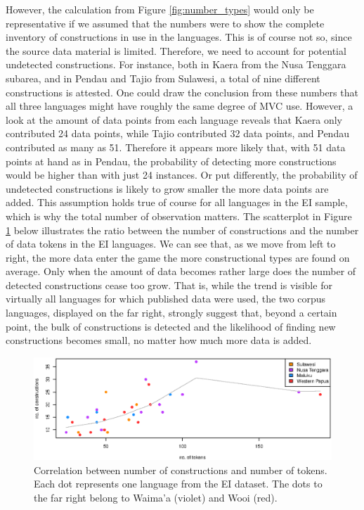 However, the calculation from Figure \ref{fig:number_types} would only be representative if we assumed that the numbers were to show the complete inventory of constructions in use in the languages. This is of course not so, since the source data material is limited. Therefore, we need to account for potential undetected constructions. For instance, both in Kaera from the Nusa Tenggara subarea, and in Pendau and Tajio from Sulawesi, a total of nine different constructions is attested. One could draw the conclusion from these numbers that all three languages might have roughly the same degree of MVC use. However, a look at the amount of data points from each language reveals that Kaera only contributed 24 data points, while Tajio contributed 32 data points, and Pendau contributed as many as 51. Therefore it appears more likely that, with 51 data points at hand as in Pendau, the probability of detecting more constructions would be higher than with just 24 instances. Or put differently, the probability of undetected constructions is likely to grow smaller the more data points are added. This assumption holds true of course for all languages in the EI sample, which is why the total number of observation matters. The scatterplot in Figure \ref{fig:constructions_tokens} below illustrates the ratio between the number of constructions and the number of data tokens in the EI languages. We can see that, as we move from left to right, the more data enter the game the more constructional types are found on average. Only when the amount of data becomes rather large does the number of detected constructions cease too grow. That is, while the trend is visible for virtually all languages for which published data were used, the two corpus languages, displayed on the far right, strongly suggest that, beyond a certain point, the bulk of constructions is detected and the likelihood of finding new constructions becomes small, no matter how much more data is added.

\begin{figure}
\includegraphics[width=\linewidth]{figures/constructions_tokens_clean.eps}
\caption[Correlation between number of constructions and number of tokens]{Correlation between number of constructions and number of tokens. Each dot represents one language from the EI dataset. The dots to the far right belong to Waima'a (violet) and Wooi (red).}\label{fig:constructions_tokens}
\end{figure}

